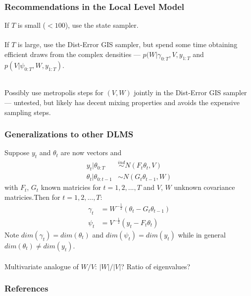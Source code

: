 \documentclass[xcolor=dvipsnames]{beamer}
\begin{document}
\begin{frame}
\frametitle{Recommendations in the Local Level Model}
If $T$ is small ($<100$), use the state sampler.\\~\\

If $T$ is large, use the Dist-Error GIS sampler, but spend some time obtaining efficient draws from the complex densities --- $p(W|\gamma_{0:T},V,y_{1:T}$ and $p(V|\psi_{0:T},W,y_{1:T})$.\\~\\
\pause

Possibly use metropolis steps for $(V,W)$ jointly in the Dist-Error GIS sampler --- untested, but likely has decent mixing properties and avoids the expensive sampling steps.
\end{frame}

\begin{frame}
  \frametitle{Generalizations to other DLMS}
Suppose $y_t$ and $\theta_t$ are now vectors and
\begin{align*}
  y_t|\theta_{0:T} & \stackrel{ind}{\sim} N(F_t\theta_t, V)\\
  \theta_t|\theta_{0:t-1} & \sim N(G_t\theta_{t-1}, W)
\end{align*}
with $F_t$, $G_t$ known matricies for $t=1,2,...,T$ and $V$, $W$ unknown covariance matricies.\pause Then for $t=1,2,...,T$:
\begin{align*}
  \gamma_t & = W^{-\frac{1}{2}}(\theta_t - G_t\theta_{t-1})\\
  \psi_t & = V^{-\frac{1}{2}}(y_t - F_t\theta_t)
\end{align*}
Note $dim(\gamma_t)=dim(\theta_t)$ and $dim(\psi_t)=dim(y_t)$ while in general $dim(\theta_t)\neq dim(y_t)$.\\~\\
\pause
Multivariate analogue of $W/V$: $|W|/|V|$? Ratio of eigenvalues?
\end{frame}
\begin{frame}[allowframebreaks]
        \frametitle{References}
        
        
\end{frame} 
\end{document}
